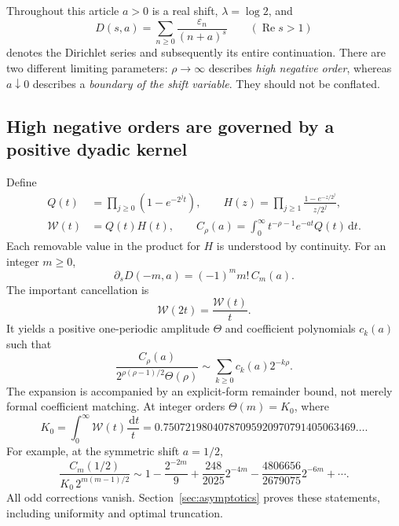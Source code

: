\documentclass[11pt,letterpaper]{article}
\numberwithin{equation}{section}
\theoremstyle{definition}
\theoremstyle{remark}
\newcommand{\W}{\mathcal W}
\newcommand{\dd}{\,\mathrm d}
\newcommand{\eps}{\varepsilon}
\DeclareMathOperator{\Rea}{Re}
\begin{document}
Throughout this article $a>0$ is a real shift, $\lambda=\log 2$, and
\begin{equation}\label{eq:Dintro}
 D(s,a)=\sum_{n\ge0}\frac{\eps_n}{(n+a)^s}
 \qquad(\Rea s>1)
\end{equation}
denotes the Dirichlet series and subsequently its entire continuation.
There are two different limiting parameters: $\rho\to\infty$ describes
\emph{high negative order}, whereas $a\downarrow0$ describes a
\emph{boundary of the shift variable}. They should not be conflated.

\subsection{High negative orders are governed by a positive dyadic kernel}
Define
\begin{equation}\label{eq:mainquantities}
 \begin{split}
 Q(t)&=\prod_{j\ge0}(1-e^{-2^jt}),\qquad
 H(z)=\prod_{j\ge1}\frac{1-e^{-z/2^j}}{z/2^j},\\
 \W(t)&=Q(t)H(t),\qquad
 C_\rho(a)=\int_0^\infty t^{-\rho-1}e^{-at}Q(t)\dd t.
 \end{split}
\end{equation}
Each removable value in the product for $H$ is understood by continuity.
For an integer $m\ge0$,
\begin{equation}\label{eq:derivativeintro}
 \partial_sD(-m,a)=(-1)^m m!\,C_m(a).
\end{equation}
The important cancellation is
\begin{equation}\label{eq:cocycleintro}
 \W(2t)=\frac{\W(t)}t.
\end{equation}
It yields a positive one-periodic amplitude $\Theta$ and coefficient
polynomials $c_k(a)$ such that
\begin{equation}\label{eq:expansionintro}
 \frac{C_\rho(a)}{2^{\rho(\rho-1)/2}\Theta(\rho)}
 \sim\sum_{k\ge0}c_k(a)2^{-k\rho}.
\end{equation}
The expansion is accompanied by an explicit-form remainder bound, not merely
formal coefficient matching. At integer orders $\Theta(m)=K_0$, where
\begin{equation}\label{eq:K0intro}
 K_0=\int_0^\infty \W(t)\frac{\dd t}{t}
   =0.75072198040787095920970791405063469\ldots.
\end{equation}
For example, at the symmetric shift $a=1/2$,
\begin{equation}\label{eq:centerintro}
 \frac{C_m(1/2)}{K_0\,2^{m(m-1)/2}}
 \sim 1-\frac{2^{-2m}}9
     +\frac{248}{2025}2^{-4m}
     -\frac{4806656}{2679075}2^{-6m}+\cdots.
\end{equation}
All odd corrections vanish. Section~\ref{sec:asymptotics} proves these
statements, including uniformity and optimal truncation.
\end{document}
